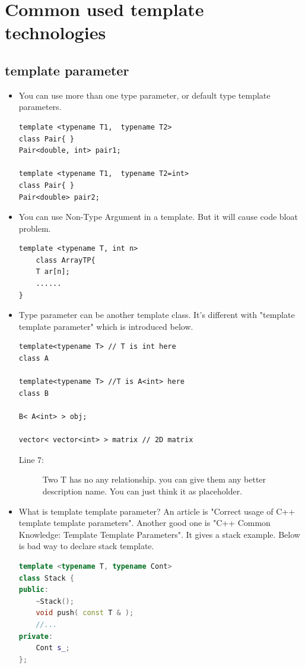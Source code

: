 \documentclass[a4paper,11pt,twoside]{book}
\begin{document}
\section{Common used template technologies}

\subsection{template parameter}

\begin{itemize}
        \item You can use more than one type parameter, or default type template parameters.
\begin{lstlisting}[numbers=none]
template <typename T1,  typename T2>
class Pair{ }
Pair<double, int> pair1;

template <typename T1,  typename T2=int>
class Pair{ }
Pair<double> pair2;
\end{lstlisting}

    \item You can use Non-Type Argument in a template. But it will cause code bloat problem. 
\begin{lstlisting}[numbers=none]
template <typename T, int n>
	class ArrayTP{
	T ar[n];
	......
}
\end{lstlisting}

    \item Type parameter can be another template class.  It's different with "template template parameter" which is introduced below.
\begin{lstlisting}[numbers=none]
template<typename T> // T is int here
class A

template<typename T> //T is A<int> here
class B

B< A<int> > obj;

vector< vector<int> > matrix // 2D matrix
\end{lstlisting}
\begin{description}
	\item[Line 7:] Two T has no any relationship. you can give them any better description name. You can just think it as placeholder.
\end{description}

    \item What is template template parameter? An article is "Correct usage of C++ template template parameters". Another good one is "C++ Common Knowledge: Template Template Parameters". It gives a stack example. Below is bad way to declare stack template.
\begin{lstlisting}[frame=single, language=c++]
template <typename T, typename Cont>
class Stack {
public:
	~Stack();
	void push( const T & );
	//...
private:
	Cont s_;
};


\end{lstlisting}
\end{itemize}
\end{document}
